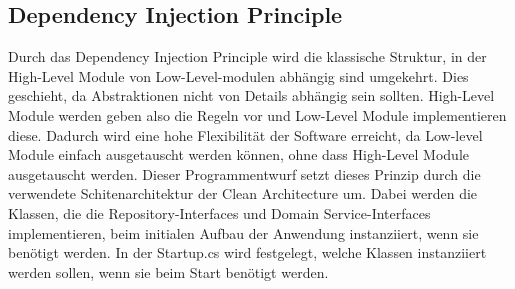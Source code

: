 \subsection{Dependency Injection Principle}
Durch das Dependency Injection Principle wird die klassische Struktur, in der High-Level Module von Low-Level-modulen abhängig sind umgekehrt. Dies geschieht, da Abstraktionen nicht von Details abhängig sein sollten. High-Level Module werden 
geben also die Regeln vor und Low-Level Module implementieren diese. Dadurch wird eine hohe Flexibilität der Software erreicht, da Low-level Module einfach ausgetauscht werden können, ohne dass High-Level Module ausgetauscht werden.
\newline Dieser Programmentwurf setzt dieses Prinzip durch die verwendete Schitenarchitektur der Clean Architecture um. Dabei werden die Klassen, die die Repository-Interfaces und Domain Service-Interfaces implementieren, beim initialen Aufbau der Anwendung instanziiert, wenn sie benötigt werden. 
In der \glqq Startup.cs \grqq wird festgelegt, welche Klassen instanziiert werden sollen, wenn sie beim Start benötigt werden.

